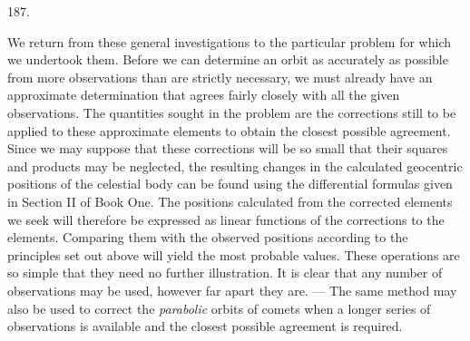 \begin{center}\hypertarget{native-260-article187}{}187.\end{center}
We return from these general investigations to the particular problem for
which we undertook them. Before we can determine an orbit as accurately
as possible from more observations than are strictly necessary, we must
already have an approximate determination that agrees fairly closely with
all the given observations. The quantities sought in the problem are the
corrections still to be applied to these approximate elements to obtain the
closest possible agreement. Since we may suppose that these corrections
will be so small that their squares and products may be
neglected, the resulting changes in the calculated geocentric positions of
the celestial body can be found using the differential formulas given in
Section II of Book One. The positions calculated from the corrected elements
we seek will therefore be expressed as linear functions of the corrections
to the elements. Comparing them with the observed positions according to
the principles set out above will yield the most probable values. These
operations are so simple that they need no further illustration. It is clear
that any number of observations may be used, however far apart they are.
--- The same method may also be used to correct the \emph{parabolic} orbits of
comets when a longer series of observations is available and the closest
possible agreement is required.
